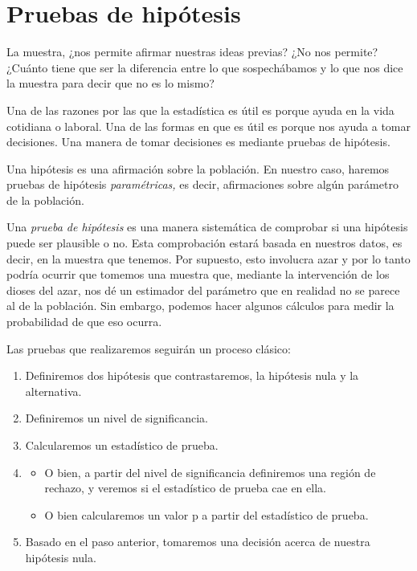 \chapter{Pruebas de hipótesis}

\begin{ideanote}
La muestra, ¿nos permite afirmar nuestras ideas previas? ¿No nos permite? ¿Cuánto tiene que ser la diferencia entre lo que sospechábamos y lo que nos dice la muestra para decir que no es lo mismo?
\end{ideanote}

Una de las razones por las que la estadística es útil es porque ayuda en la vida cotidiana o laboral. Una de las formas en que es útil es porque nos ayuda a tomar decisiones. Una manera de tomar decisiones es mediante pruebas de hipótesis.

Una hipótesis es una afirmación sobre la población. En nuestro caso, haremos pruebas de hipótesis \emph{paramétricas,} es decir, afirmaciones sobre algún parámetro de la población.

Una \emph{prueba de hipótesis} es una manera sistemática de comprobar si una hipótesis puede ser plausible o no. Esta comprobación estará basada en nuestros datos, es decir, en la muestra que tenemos. Por supuesto, esto involucra azar y por lo tanto podría ocurrir que tomemos una muestra que, mediante la intervención de los dioses del azar, nos dé un estimador del parámetro que en realidad no se parece al de la población. Sin embargo, podemos hacer algunos cálculos para medir la probabilidad de que eso ocurra.

Las pruebas que realizaremos seguirán un proceso clásico:
\begin{enumerate}
\item Definiremos dos hipótesis que contrastaremos, la hipótesis nula y la alternativa.
\item Definiremos un nivel de significancia.
\item Calcularemos un estadístico de prueba.
\item \begin{itemize}
\item O bien, a partir del nivel de significancia definiremos una región de rechazo, y veremos si el estadístico de prueba cae en ella.
\item O bien calcularemos un valor p a partir del estadístico de prueba.
\end{itemize}
\item Basado en el paso anterior, tomaremos una decisión acerca de nuestra hipótesis nula.
\end{enumerate}

